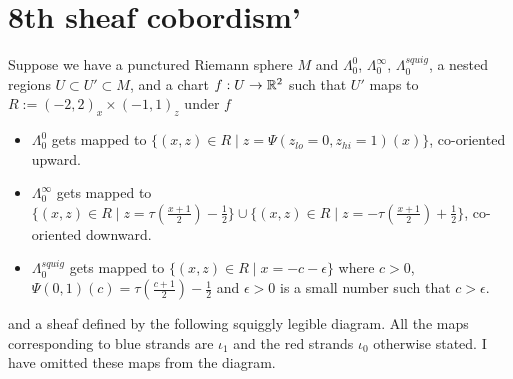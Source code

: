 \section{8th sheaf cobordism'}
Suppose we have a punctured Riemann sphere $M$ and $\Lambda_0^0$, $\Lambda_0^\infty$, $\Lambda_0^{squig}$, a nested regions $U\subset U' \subset M$, and a chart $f : U \rightarrow \mathbb{R}^2$ such that $U'$ maps to $R:=(-2,2)_x \times (-1,1)_z$ under $f$
\begin{itemize}
\item $\Lambda_0^0$ gets mapped to $\{(x,z)\in R \mid z=\Psi(z_{lo} = 0,z_{hi}=1)(x)\}$, co-oriented upward.

\item $\Lambda_0^\infty$ gets mapped to $\{(x,z)\in R \mid z=\tau(\frac{x+1}{2})-\frac{1}{2}\}\cup \{(x,z)\in R \mid z=-\tau(\frac{x+1}{2})+\frac{1}{2}\}$, co-oriented downward.

\item $\Lambda_0^{squig}$ gets mapped to $\{(x,z)\in R \mid x = -c-\epsilon\}$ where $c>0$, $\Psi(0,1)(c) = \tau(\frac{c+1}{2})-\frac{1}{2}$ and $\epsilon >0$ is a small number such that $c>\epsilon$.
\end{itemize}
and a sheaf defined by the following squiggly legible diagram. All the maps corresponding to blue strands are $\iota_1$ and the red strands $\iota_0$ otherwise stated. I have omitted these maps from the diagram.\\

